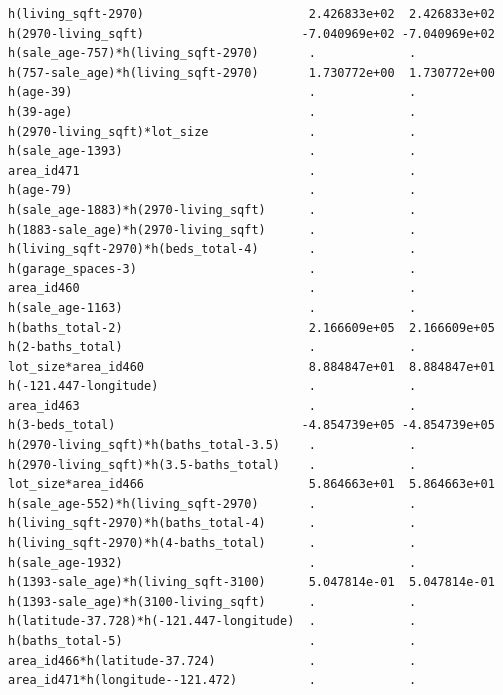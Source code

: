 \documentclass[
]{article}
\begin{document}
\begin{verbatim}
h(living_sqft-2970)                       2.426833e+02  2.426833e+02
h(2970-living_sqft)                      -7.040969e+02 -7.040969e+02
h(sale_age-757)*h(living_sqft-2970)       .             .           
h(757-sale_age)*h(living_sqft-2970)       1.730772e+00  1.730772e+00
h(age-39)                                 .             .           
h(39-age)                                 .             .           
h(2970-living_sqft)*lot_size              .             .           
h(sale_age-1393)                          .             .           
area_id471                                .             .           
h(age-79)                                 .             .           
h(sale_age-1883)*h(2970-living_sqft)      .             .           
h(1883-sale_age)*h(2970-living_sqft)      .             .           
h(living_sqft-2970)*h(beds_total-4)       .             .           
h(garage_spaces-3)                        .             .           
area_id460                                .             .           
h(sale_age-1163)                          .             .           
h(baths_total-2)                          2.166609e+05  2.166609e+05
h(2-baths_total)                          .             .           
lot_size*area_id460                       8.884847e+01  8.884847e+01
h(-121.447-longitude)                     .             .           
area_id463                                .             .           
h(3-beds_total)                          -4.854739e+05 -4.854739e+05
h(2970-living_sqft)*h(baths_total-3.5)    .             .           
h(2970-living_sqft)*h(3.5-baths_total)    .             .           
lot_size*area_id466                       5.864663e+01  5.864663e+01
h(sale_age-552)*h(living_sqft-2970)       .             .           
h(living_sqft-2970)*h(baths_total-4)      .             .           
h(living_sqft-2970)*h(4-baths_total)      .             .           
h(sale_age-1932)                          .             .           
h(1393-sale_age)*h(living_sqft-3100)      5.047814e-01  5.047814e-01
h(1393-sale_age)*h(3100-living_sqft)      .             .           
h(latitude-37.728)*h(-121.447-longitude)  .             .           
h(baths_total-5)                          .             .           
area_id466*h(latitude-37.724)             .             .           
area_id471*h(longitude--121.472)          .             .           
                                                                    

\end{verbatim}
\end{document}
